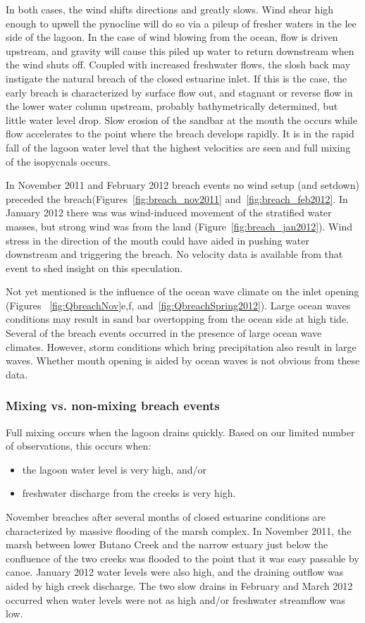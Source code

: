 In both cases, the wind shifts directions and greatly slows. Wind shear high enough to upwell the pynocline will do so via a pileup of fresher waters in the lee side of the lagoon. In the case of wind blowing from the ocean, flow is driven upstream, and gravity will cause this piled up water to return downstream when the wind shuts off. Coupled with increased freshwater flows, the slosh back may instigate the natural breach of the closed estuarine inlet. 
If this is the case, the early breach is characterized by surface flow out, and stagnant or reverse flow in the lower water column upstream, probably bathymetrically determined, but little water level drop. Slow erosion of the sandbar at the mouth the occurs while flow accelerates to the point where the breach develops rapidly. It is in the rapid fall of the lagoon water level that the highest velocities are seen and full mixing of the isopycnals occurs. 

In November 2011 and February 2012 breach events no wind setup (and setdown) preceded the breach(Figures~\ref{fig:breach_nov2011} and~\ref{fig:breach_feb2012}. In January 2012 there was was wind-induced movement of the stratified water masses, but strong wind was from the land (Figure~\ref{fig:breach_jan2012}). Wind stress in the direction of the mouth could have aided in pushing water downstream and triggering the breach. No velocity data is available from that event to shed insight on this speculation.

Not yet mentioned is the influence of the ocean wave climate on the inlet opening (Figures ~\ref{fig:QbreachNov}e,f, and~\ref{fig:QbreachSpring2012}). Large ocean waves conditions may result in sand bar overtopping from the ocean side at high tide. Several of the breach events occurred in the presence of large ocean wave climates. However, storm conditions which bring precipitation also result in large waves. Whether mouth opening is aided by ocean waves is not obvious from these data. 

\subsubsection{Mixing vs. non-mixing breach events}

Full mixing occurs when the lagoon drains quickly. Based on our limited number of observations, this occurs when:
\begin{itemize}
	\item the lagoon water level is very high, and/or
	\item freshwater discharge from the creeks is very high.
\end{itemize}
November breaches after several months of closed estuarine conditions are characterized by massive flooding of the marsh complex. In November 2011, the marsh between lower Butano Creek and the narrow estuary just below the confluence of the two creeks was flooded to the point that it was easy passable by canoe. January 2012 water levels were also high, and the draining outflow was aided by high creek discharge. The two slow drains in February and March 2012 occurred when water levels were not as high and/or freshwater streamflow was low.

